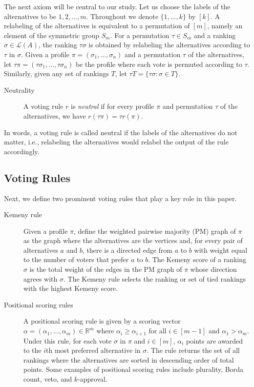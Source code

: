 \documentclass[prodmode]{acmsmall-ec14}
\newcommand{\calL}{{\mathcal{L}}}
\newcommand{\rank}{{\calL(A)}}
\begin{document}
The next axiom will be central to our study. Let us choose the labels of the alternatives to be $1,2,\ldots,m$. Throughout we denote $\{1,\ldots,k\}$ by $[k]$. A relabeling of the alternatives is equivalent to a permutation of $[m]$, namely an element of the symmetric group $S_m$. For a permutation $\tau \in S_m$ and a ranking $\sigma \in \rank$, the ranking $\tau\sigma$ is obtained by relabeling the alternatives according to $\tau$ in $\sigma$. Given a profile $\pi = (\sigma_1,\ldots,\sigma_n)$ and a permutation $\tau$ of the alternatives, let $\tau \pi = (\tau \sigma_1,\ldots,\tau \sigma_n)$ be the profile where each vote is permuted according to $\tau$. Similarly, given any set of rankings $T$, let $\tau T = \{\tau \sigma : \sigma \in T\}$.
%
\begin{description}
\item[Neutrality] A voting rule $r$ is \emph{neutral} if for every profile $\pi$ and permutation $\tau$ of the alternatives, we have $r(\tau \pi) = \tau r(\pi)$.
\end{description}
%
In words, a voting rule is called neutral if the labels of the alternatives do not matter, i.e., relabeling the alternatives would relabel the output of the rule accordingly.  

\subsection*{Voting Rules} Next, we define two prominent voting rules that play a key role in this paper.

\begin{description}
\item[Kemeny rule] Given a profile $\pi$, define the weighted pairwise majority (PM) graph of $\pi$ as the graph where the alternatives are the vertices and, for every pair of alternatives $a$ and $b$, there is a directed edge from $a$ to $b$ with weight equal to the number of voters that prefer $a$ to $b$. The Kemeny score of a ranking $\sigma$ is the total weight of the edges in the PM graph of $\pi$ whose direction agrees with $\sigma$. The Kemeny rule selects the ranking or set of tied rankings with the highest Kemeny score.

\item[Positional scoring rules] A positional scoring rule is given by a scoring vector $\alpha = (\alpha_1,\ldots,\alpha_m) \in \mathbb{R}^m$ where $\alpha_i \ge \alpha_{i+1}$ for all $i \in [m-1]$ and $\alpha_1 > \alpha_m$. Under this rule, for each vote $\sigma$ in $\pi$ and $i \in [m]$, $\alpha_i$ points are awarded to the $i${th} most preferred alternative in $\sigma$. The rule returns the set of all rankings where the alternatives are sorted in descending order of total points. Some examples of positional scoring rules include plurality, Borda count, veto, and $k$-approval.
\end{description}
\end{document}
